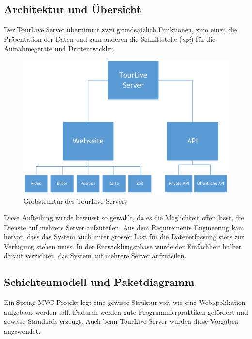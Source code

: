 \subsection{Architektur und Übersicht}
Der TourLive Server übernimmt zwei grundsätzlich Funktionen, zum einen die Präsentation der Daten und zum anderen die Schnittstelle (\textit{\gls{api}}) für die Aufnahmegeräte und Drittentwickler.
\begin{figure}[H]
	\centering
	\includegraphics[width=130mm]{images/tourliveweb/uebersicht_tourlive.png}
	\caption{Grobstruktur des TourLive Servers}
	\label{fig:grobstrukturtourliveserver}
\end{figure}
Diese Aufteilung wurde bewusst so gewählt, da es die Möglichkeit offen lässt, die Dienste auf mehrere Server aufzuteilen. Aus dem Requirements Engineering kam hervor, dass das System auch unter grosser Last für die Datenerfassung stets zur Verfügung stehen muss. In der Entwicklungsphase wurde der Einfachheit halber darauf verzichtet, das System auf mehrere Server aufzuteilen.

\subsection{Schichtenmodell und Paketdiagramm}
Ein Spring MVC Projekt legt eine gewisse Struktur vor, wie eine Webapplikation aufgebaut werden soll. Dadurch werden gute Programmierpraktiken gefördert und gewisse Standards erzeugt. Auch beim TourLive Server wurden diese Vorgaben angewendet.
\\

